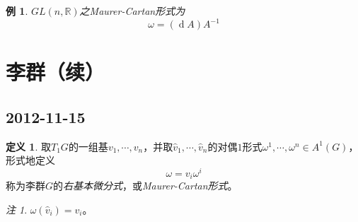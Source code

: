 \documentclass[winfonts,UTF8,c5size,a4paper,fancyhdr,hyperref,titlepage,nocap]{ctexart}
\newtheorem{exa}[thm]{例}
\theoremstyle{definition}
\newtheorem{defn}[thm]{定义}
\theoremstyle{remark}
\newtheorem*{rem}{注}
\numberwithin{equation}{subsection}
\newcommand{\Real}{\mathbb{R}}
\newcommand{\red}{\color{red}}
\newcommand{\dd}{\operatorname{d}}
\begin{document}
\begin{exa}
  $GL(n,\Real)$之Maurer-Cartan形式为
  \begin{equation*}
    \omega=(\dd A)A^{-1}
  \end{equation*}
\end{exa}

\section{李群（续）}
\subsection*{2012-11-15}
\begin{defn}
  取$T_1G$的一组基$v_1,\cdots,v_n$，并取$\widehat{v}_1,\cdots,\widehat{v}_n$的对偶$1$形式$\omega^1,\cdots,\omega^n\in A^1(G)$，形式地定义
  \begin{equation*}
    \omega=v_i\omega^i
  \end{equation*}
  称为李群$G$的\emph{\red 右基本微分式}，或\emph{\red Maurer-Cartan形式}。
\end{defn}
\begin{rem}
$\omega(\widehat{v}_i)=v_i$。
\end{rem}
\end{document}
